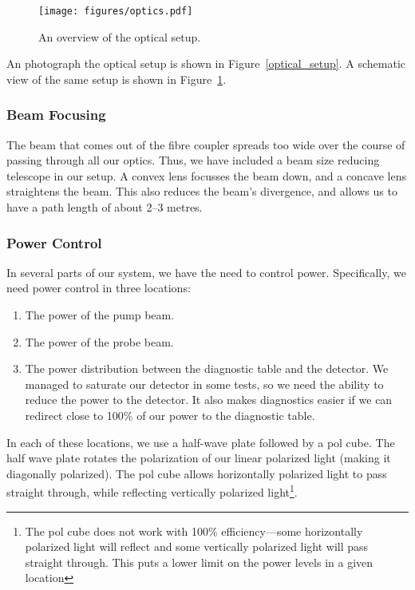 \begin{figure}
  \texttt{[image: figures/optics.pdf]}
  \centering\caption{An overview of the optical setup.}
  \label{optics}
\end{figure}

An photograph the optical setup is shown in Figure~\ref{optical_setup}.  A schematic view of the same setup is shown in Figure~\ref{optics}.

    \subsubsection{Beam Focusing}
    
The beam that comes out of the fibre coupler spreads too wide over the course of passing through all our optics.  Thus, we have included a beam size reducing telescope in our setup.  A convex lens focusses the beam down, and a concave lens straightens the beam.  This also reduces the beam's divergence, and allows us to have a path length of about 2--3 metres. \\

    \subsubsection{Power Control}
    
In several parts of our system, we have the need to control power.  Specifically, we need power control in three locations: \\

\begin{enumerate}
    \item The power of the pump beam.
    \item The power of the probe beam.
    \item The power distribution between the diagnostic table and the detector.  We managed to saturate our detector in some tests, so we need the ability to reduce the power to the detector.  It also makes diagnostics easier if we can redirect close to 100\% of our power to the diagnostic table.
\end{enumerate}

In each of these locations, we use a half-wave plate followed by a pol cube.  The half wave plate rotates the polarization of our linear polarized light (making it diagonally polarized).  The pol cube allows horizontally polarized light to pass straight through, while reflecting vertically polarized light\footnote{The pol cube does not work with 100\% efficiency—some horizontally polarized light will reflect and some vertically polarized light will pass straight through.  This puts a lower limit on the power levels in a given location}. \\

